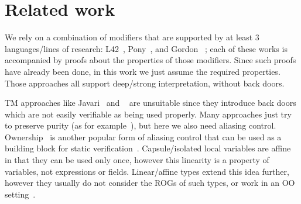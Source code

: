 \section{Related work}
\label{s:related}

We rely on a combination of modifiers that are supported by at least 3 languages/lines of research:
L42~\cite{ServettoZucca15,ServettoEtAl13a,JOT:issue_2011_01/article1,GianniniEtAl16},
Pony~\cite{clebsch2015deny,clebsch2017orca}, and Gordon \etal~\cite{GordonEtAl12}; 
each of these works is accompanied by proofs about the properties of those modifiers.
Since such proofs have already been done, in this work we just assume the required properties.
Those approaches all support deep/strong interpretation, without back doors.

TM approaches like Javari~\cite{TschantzErnst05,Boyland06} and ~\cite{matsakis2014rust} are unsuitable since they introduce back doors which are not easily verifiable as being used properly.
Many approaches just try to preserve purity (as for example~\cite{pearce2011jpure}), but here we also need aliasing control.
Ownership~\cite{ClarkeEtAl13,ZibinEtAl10,DietlEtAl07} is another popular form of aliasing control that can be used as a building block for static verification~\cite{%
muller2002modular,%
barnett2011specification%
}.
Capsule/isolated local variables are affine in that they can be used only once, however this linearity is a property of variables, not expressions or fields. Linear/affine types extend this idea further, however they usually do not consider the ROGs of such types, or work in an OO setting~\cite{ahmed20073,fahndrich2002adoption}.



